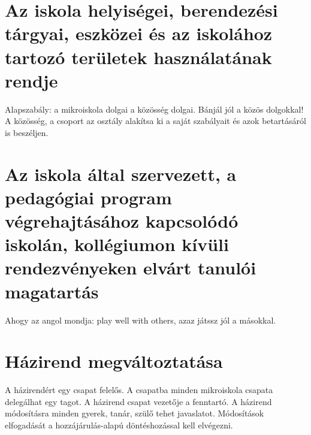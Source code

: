 \documentclass{article}
\begin{document}
\section{Az iskola helyiségei, berendezési tárgyai, eszközei és az iskolához tartozó területek használatának rendje}
Alapszabály: a mikroiskola dolgai a közösség dolgai. Bánjál jól a közös dolgokkal! A közösség, a csoport az osztály alakítsa ki a saját szabályait és azok betartásáról is beszéljen.

\section{Az iskola által szervezett, a pedagógiai program végrehajtásához kapcsolódó iskolán, kollégiumon kívüli rendezvényeken elvárt tanulói magatartás}
Ahogy az angol mondja: play well with others, azaz játssz jól a másokkal.

\section{Házirend megváltoztatása}
A házirendért egy csapat felelős. A csapatba minden mikroiskola csapata delegálhat egy tagot. A házirend csapat vezetője a fenntartó. A házirend módosításra minden gyerek, tanár, szülő tehet javaslatot. Módosítások elfogadását a hozzájárulás-alapú döntéshozással kell elvégezni.
\end{document}
